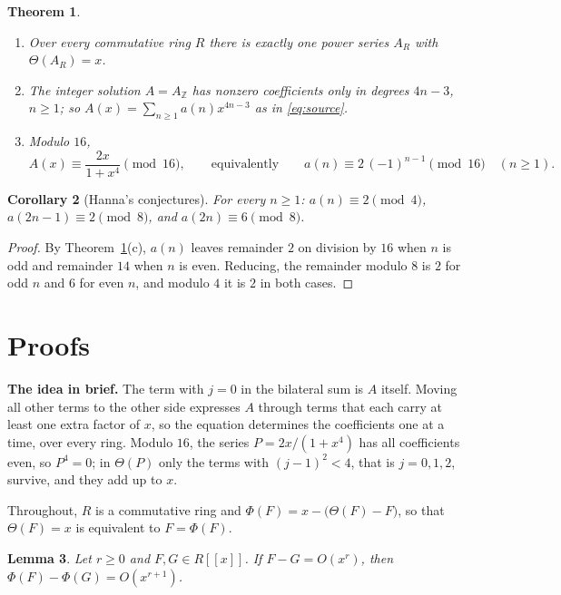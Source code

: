 \documentclass[11pt,a4paper]{article}
\newtheorem{theorem}{Theorem}[section]
\newtheorem{lemma}[theorem]{Lemma}
\newtheorem{corollary}[theorem]{Corollary}
\theoremstyle{definition}
\theoremstyle{remark}
\newcommand{\Z}{\mathbb{Z}}
\newcommand{\ps}[1]{#1[[x]]}
\newcommand{\para}[1]{\par\medskip\noindent\textbf{#1}\enspace}
\begin{document}
\begin{theorem}\label{thm:main}
\begin{enumerate}[label=(\alph*)]
\item Over every commutative ring $R$ there is exactly one power series $A_R$ with $\Theta(A_R)=x$.
\item The integer solution $A=A_\Z$ has nonzero coefficients only in degrees $4n-3$, $n\ge1$; so
$A(x)=\sum_{n\ge1}a(n)x^{4n-3}$ as in \eqref{eq:source}.
\item Modulo $16$,
\[
A(x)\equiv\frac{2x}{1+x^4}\pmod{16},\qquad\text{equivalently}\qquad a(n)\equiv2\,(-1)^{n-1}\pmod{16}\quad(n\ge1).
\]
\end{enumerate}
\end{theorem}

\begin{corollary}[Hanna's conjectures]\label{cor:conj}
For every $n\ge1$: $a(n)\equiv2\pmod4$, $a(2n-1)\equiv2\pmod8$, and $a(2n)\equiv6\pmod8$.
\end{corollary}

\begin{proof}
By Theorem~\ref{thm:main}(c), $a(n)$ leaves remainder $2$ on division by $16$ when $n$ is odd and remainder $14$ when $n$
is even. Reducing, the remainder modulo $8$ is $2$ for odd $n$ and $6$ for even $n$, and modulo $4$ it is $2$ in both
cases.
\end{proof}

\section{Proofs}\label{sec:proofs}

\para{The idea in brief.} The term with $j=0$ in the bilateral sum is $A$ itself. Moving all other terms to the other
side expresses $A$ through terms that each carry at least one extra factor of $x$, so the equation determines the
coefficients one at a time, over every ring. Modulo $16$, the series $P=2x/(1+x^4)$ has all coefficients even, so
$P^4=0$; in $\Theta(P)$ only the terms with $(j-1)^2<4$, that is $j=0,1,2$, survive, and they add up to $x$.

Throughout, $R$ is a commutative ring and $\Phi(F)=x-\bigl(\Theta(F)-F\bigr)$, so that $\Theta(F)=x$ is equivalent to
$F=\Phi(F)$.

\begin{lemma}\label{lem:contract}
Let $r\ge0$ and $F,G\in\ps{R}$. If $F-G=O(x^r)$, then $\Phi(F)-\Phi(G)=O(x^{r+1})$.
\end{lemma}
\end{document}
